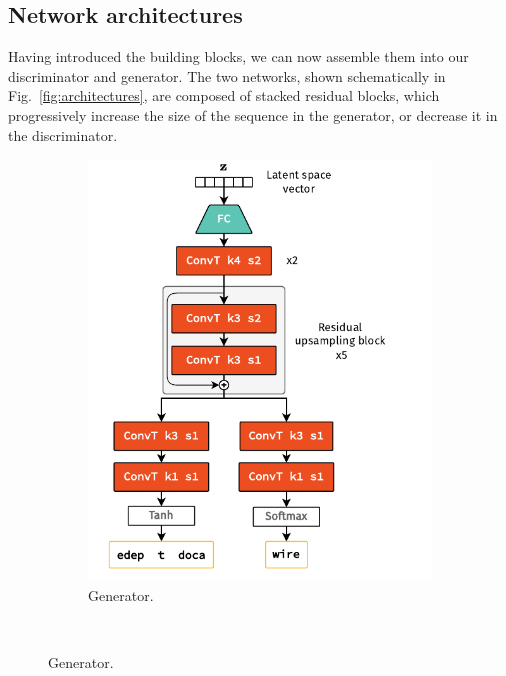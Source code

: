 \subsection{Network architectures}
Having introduced the building blocks, we can now assemble them into our discriminator and generator. The two networks, shown schematically in Fig.~\ref{fig:architectures}, are composed of stacked residual blocks, which progressively increase the size of the sequence in the generator, or decrease it in the discriminator. 

\begin{figure}
    \centering
    \begin{subfigure}[t]{0.49\textwidth}
        \centering
        \caption{Generator.}
        \vspace{0.3cm}
        \includegraphics[width=\textwidth]{chapter4/network_architectures_gen.drawio.pdf}
        \hspace{-1cm} %
    \end{subfigure}
    \\
    \vspace{0.5cm}

\end{figure}
